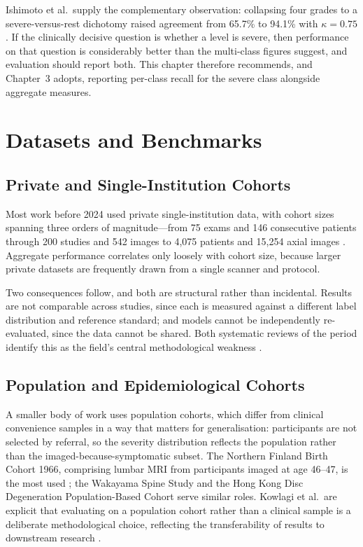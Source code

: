 Ishimoto et al.\ supply the complementary observation: collapsing four grades to
a severe-versus-rest dichotomy raised agreement from 65.7\% to 94.1\% with
$\kappa = 0.75$ \cite{ishimoto2020could}. If the clinically decisive question is
whether a level is severe, then performance on that question is considerably
better than the multi-class figures suggest, and evaluation should report both.
This chapter therefore recommends, and Chapter~3 adopts, reporting per-class
recall for the severe class alongside aggregate measures.

\section{Datasets and Benchmarks}
\label{sec:lr-datasets}

\subsection{Private and Single-Institution Cohorts}
\label{sec:lr-private-data}

Most work before 2024 used private single-institution data, with cohort sizes
spanning three orders of magnitude---from 75 exams \cite{gao2022automatic} and
146 consecutive patients \cite{lehnen2021detection} through 200 studies
\cite{bharadwaj2023deep} and 542 images \cite{won2020spinal} to 4{,}075 patients
\cite{lu2018deepspine} and 15{,}254 axial images \cite{su2022automatic}.
Aggregate performance correlates only loosely with cohort size, because larger
private datasets are frequently drawn from a single scanner and protocol.

Two consequences follow, and both are structural rather than incidental. Results
are not comparable across studies, since each is measured against a different
label distribution and reference standard; and models cannot be independently
re-evaluated, since the data cannot be shared. Both systematic reviews of the
period identify this as the field's central methodological weakness
\cite{compte2023are,mendes2026deep}.

\subsection{Population and Epidemiological Cohorts}
\label{sec:lr-population-data}

A smaller body of work uses population cohorts, which differ from clinical
convenience samples in a way that matters for generalisation: participants are
not selected by referral, so the severity distribution reflects the population
rather than the imaged-because-symptomatic subset. The Northern Finland Birth
Cohort 1966, comprising lumbar MRI from participants imaged at age 46--47, is the
most used \cite{mcsweeney2023external,kowlagi2022a}; the Wakayama Spine Study
\cite{ishimoto2020could} and the Hong Kong Disc Degeneration Population-Based
Cohort \cite{cheung2022learningbased} serve similar roles. Kowlagi et al.\ are
explicit that evaluating on a population cohort rather than a clinical sample is
a deliberate methodological choice, reflecting the transferability of results to
downstream research \cite{kowlagi2022a}.

